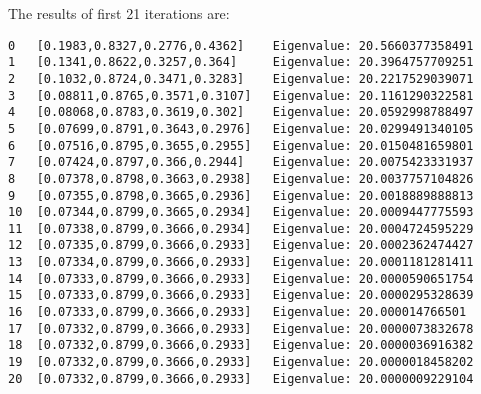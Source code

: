 \documentclass{article}
\begin{document}
The results of first 21 iterations are: 
\begin{verbatim}
0	[0.1983,0.8327,0.2776,0.4362]	 Eigenvalue: 20.5660377358491
1	[0.1341,0.8622,0.3257,0.364]	 Eigenvalue: 20.3964757709251
2	[0.1032,0.8724,0.3471,0.3283]	 Eigenvalue: 20.2217529039071
3	[0.08811,0.8765,0.3571,0.3107]	 Eigenvalue: 20.1161290322581
4	[0.08068,0.8783,0.3619,0.302]	 Eigenvalue: 20.0592998788497
5	[0.07699,0.8791,0.3643,0.2976]	 Eigenvalue: 20.0299491340105
6	[0.07516,0.8795,0.3655,0.2955]	 Eigenvalue: 20.0150481659801
7	[0.07424,0.8797,0.366,0.2944]	 Eigenvalue: 20.0075423331937
8	[0.07378,0.8798,0.3663,0.2938]	 Eigenvalue: 20.0037757104826
9	[0.07355,0.8798,0.3665,0.2936]	 Eigenvalue: 20.0018889888813
10	[0.07344,0.8799,0.3665,0.2934]	 Eigenvalue: 20.0009447775593
11	[0.07338,0.8799,0.3666,0.2934]	 Eigenvalue: 20.0004724595229
12	[0.07335,0.8799,0.3666,0.2933]	 Eigenvalue: 20.0002362474427
13	[0.07334,0.8799,0.3666,0.2933]	 Eigenvalue: 20.0001181281411
14	[0.07333,0.8799,0.3666,0.2933]	 Eigenvalue: 20.0000590651754
15	[0.07333,0.8799,0.3666,0.2933]	 Eigenvalue: 20.0000295328639
16	[0.07333,0.8799,0.3666,0.2933]	 Eigenvalue: 20.000014766501
17	[0.07332,0.8799,0.3666,0.2933]	 Eigenvalue: 20.0000073832678
18	[0.07332,0.8799,0.3666,0.2933]	 Eigenvalue: 20.0000036916382
19	[0.07332,0.8799,0.3666,0.2933]	 Eigenvalue: 20.0000018458202
20	[0.07332,0.8799,0.3666,0.2933]	 Eigenvalue: 20.0000009229104
\end{verbatim}

\hypertarget{problem_0_homework_checklist_2}{}
\end{document}
